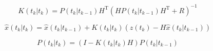 \documentclass[a4paper]{report}
\numberwithin{equation}{chapter}
\begin{document}
\begin{equation}
K \left( t_k|t_k \right) = P \left( t_k|t_{k-1} \right) H^{\mathrm{T}} \left( HP \left( t_k|t_{k-1} \right) H^{\mathrm{T}} + R \right) ^{-1}
\end{equation}

\begin{equation}
\hat{x} \left( t_k|t_k \right) = \hat{x} \left( t_k|t_{k-1} \right) + K \left( t_k|t_k \right) \left( z \left(t_k \right) - H\hat{x} \left( t_k|t_{k-1} \right) \right)
\end{equation}

\begin{equation}
P \left( t_k|t_k \right) = \left( I - K \left( t_k|t_k \right)H \right) P \left( t_k|t_{k-1} \right)
\end{equation}
\end{document}
